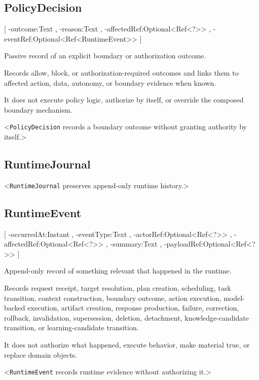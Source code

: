 \documentclass[11pt]{report}
\begin{document}
\subsection{PolicyDecision}
[
	\UMLAt-outcome:Text ,
	\UMLAt-reason:Text ,
	\UMLAt-affectedRef:Optional<Ref<?>> ,
	\UMLAt-eventRef:Optional<Ref<RuntimeEvent>>
]{%
	\item[] Passive record of an explicit boundary or authorization outcome.
	\item[] Records allow, block, or authorization-required outcomes and links them to affected action, data, autonomy, or boundary evidence when known.
	\item[] It does not execute policy logic, authorize by itself, or override the composed boundary mechanism.
}<\texttt{PolicyDecision} records a boundary outcome without granting authority by itself.>

\subsection{RuntimeJournal}
<\texttt{RuntimeJournal} preserves append-only runtime history.>

\subsection{RuntimeEvent}
[
	\UMLAt-occurredAt:Instant ,
	\UMLAt-eventType:Text ,
	\UMLAt-actorRef:Optional<Ref<?>> ,
	\UMLAt-affectedRef:Optional<Ref<?>> ,
	\UMLAt-summary:Text ,
	\UMLAt-payloadRef:Optional<Ref<?>>
]{%
	\item[] Append-only record of something relevant that happened in the runtime.
	\item[] Records request receipt, target resolution, plan creation, scheduling, task transition, context construction, boundary outcome, action execution, model-backed execution, artifact creation, response production, failure, correction, rollback, invalidation, supersession, deletion, detachment, knowledge-candidate transition, or learning-candidate transition.
	\item[] It does not authorize what happened, execute behavior, make material true, or replace domain objects.
}<\texttt{RuntimeEvent} records runtime evidence without authorizing it.>
\end{document}
